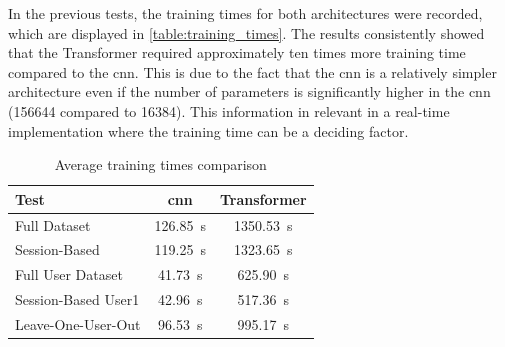 In the previous tests, the training times for both architectures were recorded, which are displayed in \autoref{table:training_times}. The results consistently showed that the Transformer required approximately ten times more training time compared to the \acs{cnn}. This is due to the fact that the \acs{cnn} is a relatively simpler architecture even if the number of parameters is significantly higher in the \acs{cnn} (\num{156644} compared to \num{16384}). This information in relevant in a real-time implementation where the training time can be a deciding factor.

\begin{table}[ht]
    \centering
    \caption{Average training times comparison}
    \label{table:training_times}
    \begin{tabular}{lcc}
        \toprule
        Test & \acs{cnn} & Transformer \\
        \midrule
        Full Dataset & \SI{126.85}{\second} & \SI{1350.53}{\second} \\
        Session-Based & \SI{119.25}{\second} & \SI{1323.65}{\second} \\
        Full User Dataset & \SI{41.73}{\second} & \SI{625.90}{\second} \\
        Session-Based User1 & \SI{42.96}{\second} & \SI{517.36}{\second} \\
        Leave-One-User-Out & \SI{96.53}{\second} & \SI{995.17}{\second} \\
        \bottomrule
    \end{tabular}
\end{table}